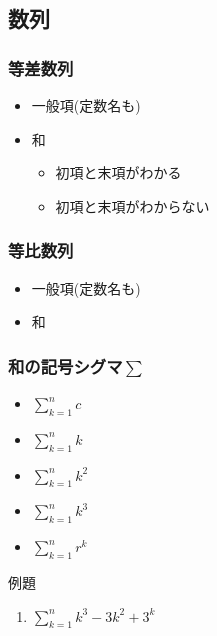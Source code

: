 \documentclass[10pt,dvipdfmx]{jsarticle}
\begin{document}
\subsection*{数列}
\subsubsection*{等差数列}
\begin{itemize}
  \item 一般項(定数名も)
  \item 和
        \begin{itemize}
          \item 初項と末項がわかる
          \item 初項と末項がわからない
        \end{itemize}
\end{itemize}
\subsubsection*{等比数列}
\begin{itemize}
  \item 一般項(定数名も)
  \item 和
\end{itemize}

\subsubsection*{和の記号シグマ$\sum$}
\begin{LARGE}
  \begin{itemize}
    \item $\sum_{k=1}^{n}c$
    \item $\sum_{k=1}^{n}k$
    \item $\sum_{k=1}^{n}k^2$
    \item $\sum_{k=1}^{n}k^3$
    \item $\sum_{k=1}^{n}r^k$
  \end{itemize}
\end{LARGE}

\begin{itembox}[l]{例題}
  \begin{large}
    \begin{enumerate}
      \item $\sum_{k=1}^{n}k^3-3k^2+3^k$
    \end{enumerate}
  \end{large}
\end{itembox}
\end{document}
